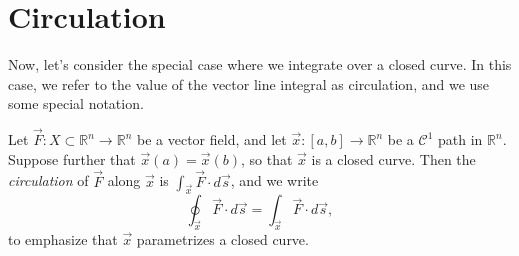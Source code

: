\documentclass{ximera}
\begin{document}
\section*{Circulation}

Now, let's consider the special case where we integrate over a closed curve. In this case, we refer to the value of the vector line integral as circulation, and we use some special notation.

\begin{definition}
Let $\vec{F}:X\subset\mathbb{R}^n\rightarrow\mathbb{R}^n$ be a vector field, and let $\vec{x}:[a,b]\rightarrow\mathbb{R}^n$ be a $\mathcal{C}^1$ path in $\mathbb{R}^n$. Suppose further that $\vec{x}(a) = \vec{x}(b)$, so that $\vec{x}$ is a closed curve. Then the \emph{circulation} of $\vec{F}$ along $\vec{x}$ is $\int_{\vec{x}}\vec{F}\cdot d\vec{s}$, and we write
\[
\oint_{\vec{x}}\vec{F}\cdot d\vec{s} = \int_{\vec{x}}\vec{F}\cdot d\vec{s},
\]
to emphasize that $\vec{x}$ parametrizes a closed curve.
\end{definition}
\end{document}
